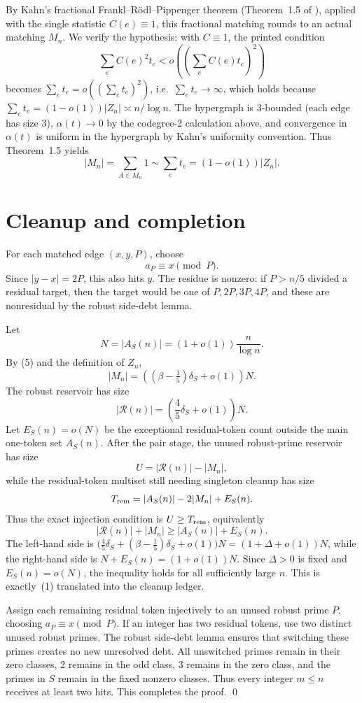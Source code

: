 \documentclass[11pt]{article}
\newcommand{\R}{\mathcal R}
\begin{document}
By Kahn's fractional Frankl--R\"odl--Pippenger theorem (Theorem~1.5 of
\cite{Kahn1996}), applied with the single statistic \(C(e)\equiv1\), this
fractional matching rounds to an actual matching \(M_n\).  We verify the
hypothesis: with \(C\equiv 1\), the printed condition
\[
  \sum_e C(e)^2 t_e<o\!\left(\left(\sum_e C(e)t_e\right)^2\right)
\]
becomes \(\sum_e t_e=o((\sum_e t_e)^2)\), i.e.\ \(\sum_e t_e\to\infty\),
which holds because \(\sum_e t_e=(1-o(1))|Z_n|\asymp n/\log n\).  The
hypergraph is 3-bounded (each edge has size 3), \(\alpha(t)\to0\) by the
codegree-2 calculation above, and convergence in \(\alpha(t)\) is uniform in
the hypergraph by Kahn's uniformity convention.  Thus Theorem~1.5 yields
\[
  |M_n|=\sum_{A\in M_n}1\sim\sum_e t_e=(1-o(1))|Z_n|.
  \tag{5}
\]

\section{Cleanup and completion}

For each matched edge \((x,y,P)\), choose
\[
  a_P\equiv x\pmod P.
\]
Since \(|y-x|=2P\), this also hits \(y\).  The residue is nonzero: if
\(P>n/5\) divided a residual target, then the target would be one of
\(P,2P,3P,4P\), and these are nonresidual by the robust side-debt lemma.

Let
\[
  N=|A_S(n)|=(1+o(1))\frac n{\log n}.
\]
By (5) and the definition of \(Z_n\),
\[
  |M_n|=\left((\beta-\tfrac15)\delta_S+o(1)\right)N.
\]
The robust reservoir has size
\[
  |\R(n)|=\left(\frac45\delta_S+o(1)\right)N.
\]
Let \(E_S(n)=o(N)\) be the exceptional residual-token count outside the main
one-token set \(A_S(n)\).  After the pair stage, the unused robust-prime
reservoir has size
\[
  U=|\R(n)|-|M_n|,
\]
while the residual-token multiset still needing singleton cleanup has size
\[
  T_{\rm rem}=|A_S(n)|-2|M_n|+E_S(n).
\]
Thus the exact injection condition is \(U\ge T_{\rm rem}\), equivalently
\[
  |\R(n)|+|M_n|\ge|A_S(n)|+E_S(n).
\]
The left-hand side is
\(\bigl(\tfrac45\delta_S+(\beta-\tfrac15)\delta_S+o(1)\bigr)N=(1+\Delta+o(1))N\),
while the right-hand side is \(N+E_S(n)=(1+o(1))N\).  Since \(\Delta>0\) is
fixed and \(E_S(n)=o(N)\), the inequality holds for all sufficiently large
\(n\).  This is exactly~(1) translated into the cleanup ledger.

Assign each remaining residual token injectively to an unused robust prime
\(P\), choosing \(a_P\equiv x\pmod P\).  If an integer has two residual tokens,
use two distinct unused robust primes.  The robust side-debt lemma ensures that
switching these primes creates no new unresolved debt.  All unswitched primes
remain in their zero classes, \(2\) remains in the odd class, \(3\) remains in
the zero class, and the primes in \(S\) remain in the fixed nonzero classes.
Thus every integer \(m\le n\) receives at least two hits.  This completes the
proof. \qed
\end{document}

